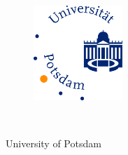 \thispagestyle{empty}


\begin{figure}[t]
	\centering
	\includegraphics[width=0.3\textwidth]{fig/humanlogo}
\end{figure}


\begin{verbatim}


\end{verbatim}

\begin{center}
\Large{University of Potsdam}\\
\end{center}


